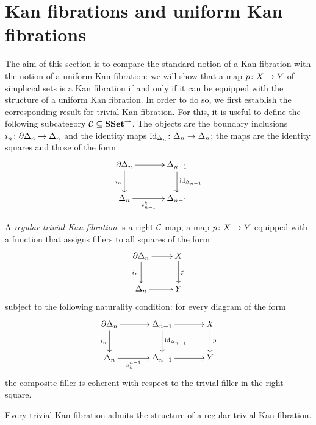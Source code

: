 \documentclass[reqno,10pt,a4paper,oneside]{amsart}
\begin{document}
\section{Kan fibrations and uniform Kan fibrations}
\label{section-kan-fib}

 The aim of this section is to compare the standard notion of a Kan fibration with the
 notion of a uniform Kan fibration: we will show that a map $p \co X \to Y$ of simplicial
 sets is a Kan fibration if and only if it can be equipped with the structure of a uniform
 Kan fibration. In order to do so, we first establish the corresponding result for 
 trivial Kan fibration. For this, it is useful to define the following subcategory $\cal{C} \subseteq \SSet^\to$. The objects are the boundary inclusions
$i_n \co \partial \Delta_n \to \Delta_n$ and the identity maps $\id_{\Delta_n} \co \Delta_n \to \Delta_n$; the
maps are the identity squares and those of the form
 \[
\xymatrix@C=1.2cm{
  \partial \Delta_n
  \ar[r]
  \ar[d]_{i_n}
&
  \Delta_{n-1}
  \ar[d]^{\id_{\Delta_{n-1}}}
\\
  \Delta_n
  \ar[r]_-{s^k_{n-1}}
&
  \Delta_{n-1}
}
\] 


\begin{definition} A \emph{regular trivial Kan fibration} is a right $\cal{C}$-map, \ie a map $p \co X \to Y$ 
equipped with a function that assigns fillers to all squares of the form
\begin{equation}
\label{equ:boundary-filler}
\xycenter{
\partial \Delta_n \ar[d]_{i_n} \ar[r] & X \ar[d]^{p} \\
\Delta_n \ar[r] & Y } 
\end{equation}
subject to the following naturality condition: for every diagram of the form
\begin{equation}
\label{equ:factor-via-id}
{\vcenter{\hbox{\xymatrix@C=1.2cm{
  \partial \Delta_n
  \ar[r]
  \ar[d]_{i_n}
&
  \Delta_{n-1}
  \ar[r]
  \ar[d]^{\id_{\Delta_{n-1}}}
&
  X
  \ar[d]^{p}
\\
  \Delta_n
  \ar[r]_-{s_k^{n-1}}
&
  \Delta_{n-1}
  \ar[r]
&
  Y
}}}}
\end{equation}
the composite filler is coherent with respect to the trivial filler in the right square. 
\end{definition}


\begin{lemma}[ZFC] \label{triv-Kan-is-regular}
Every trivial Kan fibration admits the structure of a regular trivial Kan fibration.
\end{lemma}
\end{document}
